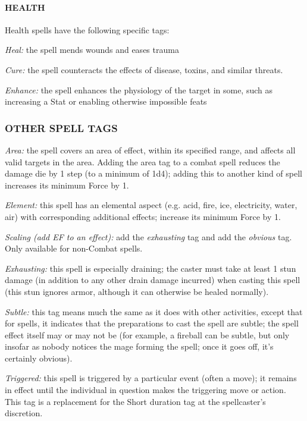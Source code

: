 \documentclass[oneside,10pt]{article}
\begin{document}
\begin{multicols}{2}
\paragraph{HEALTH}

Health spells have the following specific tags:
\begin{adjustwidth*}{.5cm}{.5cm}

\textit{Heal:} the spell mends wounds and eases trauma

\textit{Cure:} the spell counteracts the effects of disease, toxins,
and similar threats.

\textit{Enhance:} the spell enhances the physiology of the target
in some, such as increasing a Stat or enabling otherwise
impossible feats
\end{adjustwidth*}
\subsubsection{OTHER SPELL TAGS}
\begin{adjustwidth*}{.5cm}{.5cm}

\textit{Area:} the spell covers an area of effect, within its specified
range, and affects all valid targets in the area. Adding the
area tag to a combat spell reduces the damage die by 1
step (to a minimum of 1d4); adding this to another kind of
spell increases its minimum Force by 1.

\textit{Element:} this spell has an elemental aspect (e.g. acid, fire,
ice, electricity, water, air) with corresponding additional
effects; increase its minimum Force by 1.

\textit{Scaling (add EF to an effect):} add the \textit{exhausting} tag and add the \textit{obvious} tag. Only available for non-Combat spells.

\textit{Exhausting:} this spell is especially draining; the caster must
take at least 1 stun damage (in addition to any other drain damage incurred) when casting this spell (this stun ignores armor, although it can otherwise be healed normally).

\textit{Subtle:} this tag means much the same as it does with other
activities, except that for spells, it indicates that the preparations to cast the spell are subtle; the spell effect itself
may or may not be (for example, a fireball can be subtle,
but only insofar as nobody notices the mage forming the
spell; once it goes off, it’s certainly obvious).

\textit{Triggered:} this spell is triggered by a particular event (often
a move); it remains in effect until the individual in question makes the triggering move or action. This tag is a
replacement for the Short duration tag at the spellcaster’s
discretion.
\end{adjustwidth*}

\end{multicols}
\end{document}
